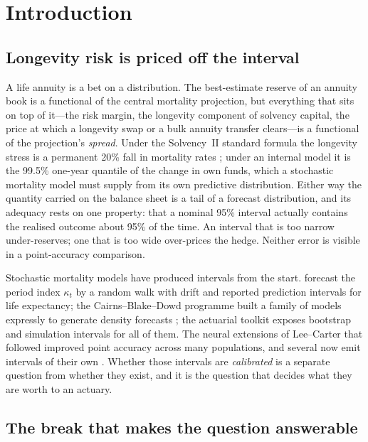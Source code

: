 \section{Introduction}
\label{sec:intro}

\subsection{Longevity risk is priced off the interval}

A life annuity is a bet on a distribution. The best-estimate reserve of an
annuity book is a functional of the central mortality projection, but
everything that sits on top of it---the risk margin, the longevity component
of solvency capital, the price at which a longevity swap or a bulk annuity
transfer clears---is a functional of the projection's \emph{spread}. Under
the Solvency~II standard formula the longevity stress is a permanent
20\% fall in mortality rates \citep{eiopa2015delegated}; under an internal
model it is the 99.5\% one-year quantile of the change in own funds, which a
stochastic mortality model must supply from its own predictive distribution.
Either way the quantity carried on the balance sheet is a tail of a forecast
distribution, and its adequacy rests on one property: that a nominal 95\%
interval actually contains the realised outcome about 95\% of the time. An
interval that is too narrow under-reserves; one that is too wide over-prices
the hedge. Neither error is visible in a point-accuracy comparison.

Stochastic mortality models have produced intervals from the start.
\citet{lee1992modeling} forecast the period index $\kappa_t$ by a random walk
with drift and reported prediction intervals for life expectancy; the
Cairns--Blake--Dowd programme built a family of models expressly to generate
density forecasts \citep{cairns2006two,cairns2009quantitative,cairns2011mortality};
the actuarial toolkit  \citep{villegas2018stmomo} exposes bootstrap
and simulation intervals for all of them. The neural extensions of
Lee--Carter that followed
\citep{richman2021neural,nigri2019deep,perla2021time,scognamiglio2022calibrating}
improved point accuracy across many populations, and several now emit
intervals of their own
\citep{marino2023neural,miyata2022extending,schnurch2022point}. Whether
those intervals are \emph{calibrated} is a separate question from whether
they exist, and it is the question that decides what they are worth to an
actuary.

\subsection{The break that makes the question answerable}

